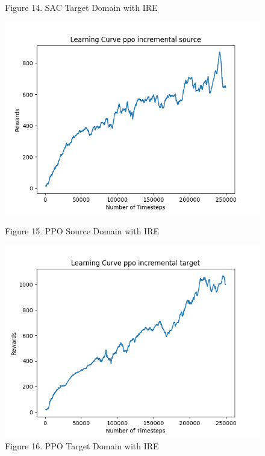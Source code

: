 \documentclass[12pt]{article}
\begin{document}
\begin{figure}[H]
\begin{minipage}{0.45\textwidth}
        \caption{Figure 14. SAC Target Domain with IRE}
        \label{fig:sac_target_ire}
    \end{minipage}
    \vfill
    \begin{minipage}{0.45\textwidth}
        \centering
        \includegraphics[width=\textwidth]{../images/Learning_Curve_PPO_Incremental_Source.png}
        \caption{Figure 15. PPO Source Domain with IRE}
        \label{fig:ppo_source_ire}
    \end{minipage}
    \hfill
    \begin{minipage}{0.45\textwidth}
        \centering
        \includegraphics[width=\textwidth]{../images/Learning_Curve_PPO_Incremental_Target.png}
        \caption{Figure 16. PPO Target Domain with IRE}
        \label{fig:ppo_target_ire}
    \end{minipage}
\end{figure}
\end{document}
